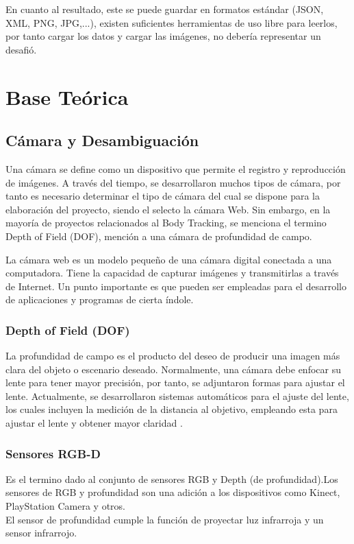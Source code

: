 En cuanto al resultado, este se puede guardar en formatos estándar (JSON, XML, PNG, JPG,...), existen suficientes herramientas de uso libre para leerlos, por tanto cargar los datos y cargar las imágenes, no debería representar un desafió.

\section{Base Teórica}

\subsection{Cámara y Desambiguación}

Una cámara se define como un dispositivo que permite el registro y reproducción de imágenes. A través del tiempo, se desarrollaron muchos tipos de cámara, por tanto es necesario determinar el tipo de cámara del cual se dispone para la elaboración del proyecto, siendo el selecto la cámara Web. Sin embargo, en la mayoría de proyectos relacionados al Body Tracking, se menciona el termino Depth of Field (DOF), mención a una cámara de profundidad de campo.

La cámara web es un modelo pequeño de una cámara digital conectada a una computadora. Tiene la capacidad de capturar imágenes y transmitirlas a través de Internet. Un punto importante es que pueden ser empleadas para el desarrollo de aplicaciones y programas de cierta índole. 


\subsubsection{Depth of Field (DOF)}

La profundidad de campo es el producto del deseo de producir una imagen más clara del objeto o escenario deseado. Normalmente, una cámara debe enfocar su lente para tener mayor precisión, por tanto, se adjuntaron formas para ajustar el lente. Actualmente, se desarrollaron sistemas automáticos para el ajuste del lente, los cuales incluyen la medición de la distancia al objetivo, empleando esta para ajustar el lente y obtener mayor claridad \cite{madsen2000depth}. 

\subsubsection{Sensores RGB-D} 

Es el termino dado al conjunto de sensores RGB y Depth (de profundidad).Los sensores de RGB y profundidad son una adición a los dispositivos como Kinect, PlayStation Camera y otros. 
\\El sensor de profundidad cumple la función de proyectar luz infrarroja y un sensor infrarrojo. 

